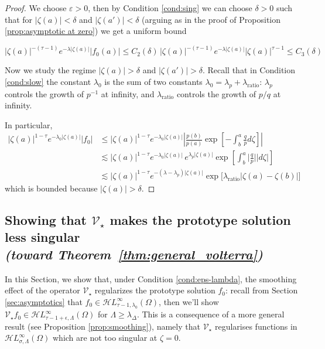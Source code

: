 \documentclass{article}
\theoremstyle{plain}
\newcommand{\singexp}[2]{\mathcal{H}L^\infty_{#1, #2}}
\newcommand{\softpart}{\mathcal{V}_\star}
\begin{document}
\begin{proof}
We choose $\varepsilon>0$, then by Condition \eqref{cond:sing} we can choose $\delta>0$ such that for $|\zeta(a)|<\delta$ and $|\zeta(a')|<\delta$ (arguing as in the proof of Proposition \ref{prop:asymptotic at zero}) we get a uniform bound 

\[   |\zeta(a)|^{-(\tau-1)} e^{-\lambda |\zeta(a)|} |f_0(a)|\leq  C_2(\delta)\, |\zeta(a)|^{-(\tau-1)} e^{-\lambda |\zeta(a)|} |\zeta(a)|^{\tau-1} \leq C_3(\delta)
\]

Now we study the regime $|\zeta(a)|>\delta$ and $|\zeta(a')|>\delta$. Recall that in Condition \eqref{cond:slow} the constant $\lambda_0$ is the sum of two constants $\lambda_0=\lambda_p+\lambda_\text{ratio}$: $\lambda_p$ controls the growth of $p^{-1}$ at infinity, and $\lambda_\text{ratio}$ controls the growth of $p/q$ at infinity. 

In particular, 
      \begin{align*}
          |\zeta(a)|^{1-\tau} e^{-\lambda_0 |\zeta(a)|} |f_0|&\leq  |\zeta(a)|^{1-\tau} e^{-\lambda_0 |\zeta(a)|} \left\vert\frac{p(b)}{p(a)}\exp\left[-\int_{b}^{a}\frac{q}{p} d\zeta\right]\right\vert \\
          & \lesssim  |\zeta(a)|^{1-\tau} e^{-\lambda_0 |\zeta(a)|}  \, e^{\lambda_p|\zeta(a)|}\exp\left[\int_{b}^{a} \Big\vert\frac{q}{p} \Big\vert |d\zeta| \right]\\
          & \lesssim  |\zeta(a)|^{1-\tau} e^{-(\lambda-\lambda_p) |\zeta(a)|} \exp\Big[\lambda_\text{ratio} |\zeta(a)-\zeta(b)| \Big]
      \end{align*}
   which is bounded because $|\zeta(a)|>\delta$. 


\end{proof}

\subsection{Showing that $\softpart$ makes the prototype solution less singular \\ \textit{(toward Theorem~\ref{thm:general_volterra})}}\label{sec:image under soft_part}

In this Section, we show that, under Condition \eqref{cond:eps-lambda}, the smoothing effect of the operator $\softpart$ regularizes the prototype solution $f_0$: recall from Section \ref{sec:asymptotics} that $f_0\in\singexp{\tau-1}{\lambda_0}(\Omega)$, then we'll show $\softpart f_0 \in\singexp{\tau-1+\epsilon}{\Lambda}(\Omega)$ for $\Lambda\geq \lambda_\Delta$. This is a consequence of a more general result (see Proposition \ref{prop:smoothing}), namely that $\softpart$ regularises functions in $\singexp{\sigma}{\Lambda}(\Omega)$ which are not too singular at $\zeta=0$.  
\end{document}
